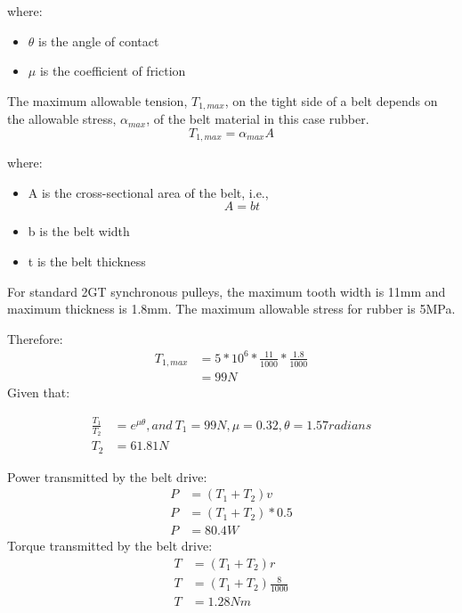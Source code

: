 where:
\begin{itemize}
    \item \(\theta\) is the angle of contact
    \item \(\mu\) is the coefficient of friction
\end{itemize}

The maximum allowable tension, \(T_{1,max}\), on the tight side of a belt depends on the allowable stress, \(\alpha_{max}\), of the belt material in this case rubber. 
\begin{equation}
    T_{1, max} = \alpha_{max}A
\end{equation}

where:
\begin{itemize}
    \item A is the cross-sectional area of the belt, i.e., \begin{equation}
        A = bt
    \end{equation}
    \item b is the belt width
    \item t is the belt thickness
\end{itemize}

For standard 2GT synchronous pulleys, the maximum tooth width is 11mm and maximum thickness is 1.8mm.
The maximum allowable stress for rubber is 5MPa.
\par
Therefore:
\begin{equation}
    \begin{aligned}
         T_{1,max}& =5*10^6*\frac{11}{1000}*\frac{1.8}{1000}\\
         & = 99N
    \end{aligned}
\end{equation}
Given that:

\begin{equation}
    \begin{aligned}
       \frac{T_1}{T_2}&= e^{\mu\theta},
        and\  
        T_1 = 99N,   \mu =0.32,  \theta= 1.57 radians\\
        T_2 &= 61.81N
    \end{aligned}
\end{equation}

Power transmitted by the belt drive:
\begin{equation}
    \begin{aligned}
        P &= (T_1 + T_2)v \\
        P &= (T_1 + T_2)*0.5\\
        P &= 80.4W
    \end{aligned}
\end{equation}
Torque transmitted by the belt drive:
\begin{equation}
    \begin{aligned}
        T &= (T_1 + T_2)r\\
        T &= (T_1 + T_2)\frac{8}{1000}\\
        T &= 1.28Nm
    \end{aligned}
\end{equation}

